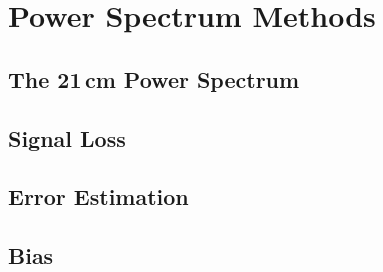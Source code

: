 \chapter{Power Spectrum Methods}
\label{c.PSmethods}


\section{The 21\,cm Power Spectrum}

\section{Signal Loss}

\section{Error Estimation}

\section{Bias}






